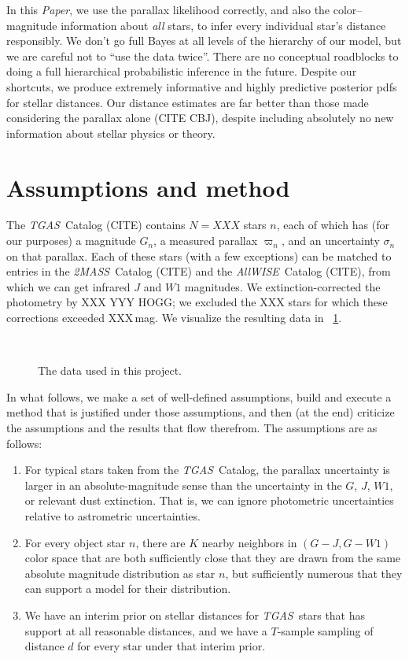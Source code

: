 \documentclass[12pt]{article}
\newcommand{\documentname}{\textsl{Paper}}
\newcommand{\project}[1]{\textsl{#1}}
\newcommand{\acronym}[1]{\small{#1}}
\newcommand{\tgas}{\project{\acronym{TGAS}}}
\newcommand{\twomass}{\project{\acronym{2MASS}}}
\newcommand{\wise}{\project{All\acronym{WISE}}}
\newcommand{\wone}{W\!\mathit{1}}
\begin{document}
In this \documentname, we use the parallax likelihood correctly, and also the
color--magnitude information about \emph{all} stars, to infer every
individual star's distance responsibly.
We don't go full Bayes at all levels of the hierarchy of our model,
but we are careful not to ``use the data twice''.
There are no conceptual roadblocks to doing a full hierarchical
probabilistic inference in the future.
Despite our shortcuts, we produce extremely informative and highly
predictive posterior pdfs for stellar distances.
Our distance estimates are far better than those made considering the
parallax alone (CITE CBJ), despite including absolutely no new
information about stellar physics or theory.

\section{Assumptions and method}

The \tgas\ Catalog (CITE) contains $N=XXX$ stars $n$, each of which has (for
our purposes) a magnitude $G_n$, a measured parallax $\varpi_n$, and
an uncertainty $\sigma_n$ on that parallax.
Each of these stars (with a few exceptions) can be matched to entries
in the \twomass\ Catalog (CITE) and the \wise\ Catalog (CITE), from
which we can get infrared $J$ and $\wone$ magnitudes.
We extinction-corrected the photometry by XXX YYY HOGG; we excluded
the XXX stars for which these corrections exceeded XXX\,mag.
We visualize the resulting data in \figurename~\ref{fig:data}.
%
\begin{figure}[p]
~~
\caption{The data used in this project.\label{fig:data}}
\end{figure}

In what follows, we make a set of well-defined assumptions, build and
execute a method that is justified under those assumptions, and then
(at the end) criticize the assumptions and the results that flow therefrom.
The assumptions are as follows:
\begin{enumerate}\itemsep=0ex
\item For typical stars taken from the \tgas\ Catalog, the parallax
  uncertainty is larger in an absolute-magnitude sense than the
  uncertainty in the $G$, $J$, $\wone$, or relevant dust extinction. That
  is, we can ignore photometric uncertainties relative to astrometric
  uncertainties.
\item For every object star $n$, there are $K$ nearby neighbors in
  $(G-J, G-\wone)$ color space that are both sufficiently close that they
  are drawn from the same absolute magnitude distribution as star $n$,
  but sufficiently numerous that they can support a model for their
  distribution.
\item We have an interim prior on stellar distances for \tgas\ stars
  that has support at all reasonable distances, and we have a
  $T$-sample sampling of distance $d$ for every star under that
  interim prior.
\end{enumerate}
\end{document}
